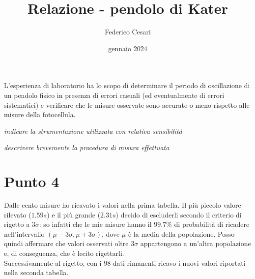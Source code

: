 \documentclass{article}
\title{Relazione - pendolo di Kater}
\author{Federico Cesari}
\date{gennaio 2024}
\begin{document}
	\maketitle
	\vspace{3cm}
	
	L'esperienza di laboratorio ha lo scopo di determinare il periodo di oscillazione di un pendolo fisico in presenza di errori casuali (ed eventualmente di errori sistematici) e verificare che le misure osservate sono accurate o meno rispetto alle misure della fotocellula.
	
	
	\textit{indicare la strumentazione utilizzata con relativa sensibilità}
	
	
	\textit{descrivere brevemente la procedura di misura effettuata}
	
	
	
	
	
	
	
	
	
	\newpage
	\section{Punto 4}
	
	Dalle cento misure ho ricavato i valori nella prima tabella. Il più piccolo valore rilevato ($1.59s$) e il più grande ($2.31s$) decido di escluderli secondo il criterio di rigetto a $3\sigma$: so infatti che le mie misure hanno il $99.7 \%$ di probabilità di ricadere nell'intervallo $(\mu  - 3\sigma , \mu + 3\sigma)$, dove $\mu$ è la media della popolazione. Posso quindi affermare che valori osservati oltre $3 \sigma$ appartengono a un'altra popolazione e, di conseguenza, che è lecito rigettarli. \\ 
	
	\noindent
	Successivamente al rigetto, con i $98$ dati rimanenti ricavo i nuovi valori riportati nella seconda tabella.
	
\end{document}
